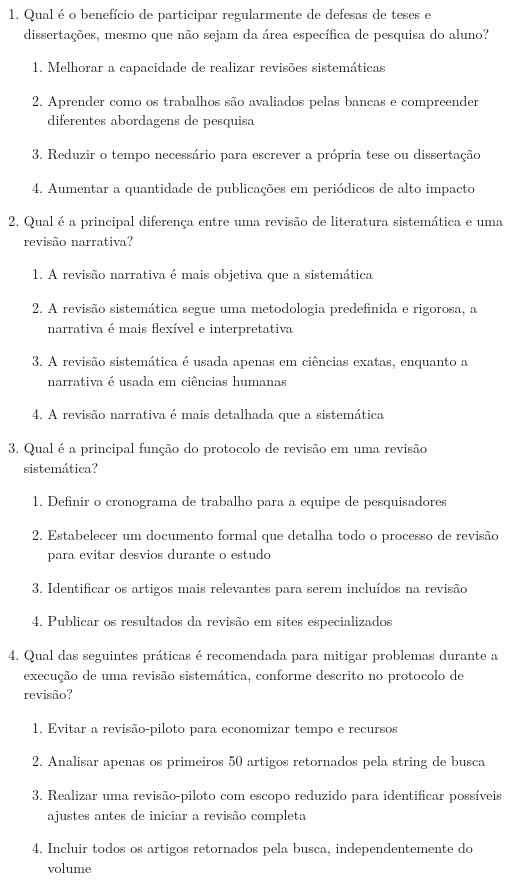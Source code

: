 \documentclass{article}
\begin{document}
\begin{enumerate}
\item Qual é o benefício de participar regularmente de defesas de teses e dissertações, mesmo que não sejam da área específica de pesquisa do aluno?
\begin{enumerate}
\item Melhorar a capacidade de realizar revisões sistemáticas
\item Aprender como os trabalhos são avaliados pelas bancas e compreender diferentes abordagens de pesquisa
\item Reduzir o tempo necessário para escrever a própria tese ou dissertação
\item Aumentar a quantidade de publicações em periódicos de alto impacto
\end{enumerate}

\item Qual é a principal diferença entre uma revisão de literatura sistemática e uma revisão narrativa?
\begin{enumerate}
    \item  A revisão narrativa é mais objetiva que a sistemática
    \item  A revisão sistemática segue uma metodologia predefinida e rigorosa, a narrativa é mais flexível e interpretativa
    \item  A revisão sistemática é usada apenas em ciências exatas, enquanto a narrativa é usada em ciências humanas
    \item  A revisão narrativa é mais detalhada que a sistemática
\end{enumerate}

\item Qual é a principal função do protocolo de revisão em uma revisão sistemática?
\begin{enumerate}
\item Definir o cronograma de trabalho para a equipe de pesquisadores
\item Estabelecer um documento formal que detalha todo o processo de revisão para evitar desvios durante o estudo
\item Identificar os artigos mais relevantes para serem incluídos na revisão
\item Publicar os resultados da revisão em sites especializados
\end{enumerate}

\item Qual das seguintes práticas é recomendada para mitigar problemas durante a execução de uma revisão sistemática, conforme descrito no protocolo de revisão?
\begin{enumerate}
\item Evitar a revisão-piloto para economizar tempo e recursos
\item Analisar apenas os primeiros 50 artigos retornados pela string de busca
\item Realizar uma revisão-piloto com escopo reduzido para identificar possíveis ajustes antes de iniciar a revisão completa
\item Incluir todos os artigos retornados pela busca, independentemente do volume
\end{enumerate}


\end{enumerate}
\end{document}
